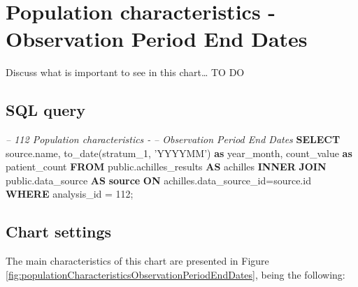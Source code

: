 \documentclass[]{book}
\newenvironment{Shaded}{\begin{snugshade}}{\end{snugshade}}
\newcommand{\KeywordTok}[1]{\textcolor[rgb]{0.13,0.29,0.53}{\textbf{#1}}}
\newcommand{\DecValTok}[1]{\textcolor[rgb]{0.00,0.00,0.81}{#1}}
\newcommand{\StringTok}[1]{\textcolor[rgb]{0.31,0.60,0.02}{#1}}
\newcommand{\CommentTok}[1]{\textcolor[rgb]{0.56,0.35,0.01}{\textit{#1}}}
\newcommand{\FunctionTok}[1]{\textcolor[rgb]{0.00,0.00,0.00}{#1}}
\newcommand{\NormalTok}[1]{#1}
\begin{document}
\section{Population characteristics - Observation Period End
Dates}\label{population-characteristics---observation-period-end-dates}

Discuss what is important to see in this chart\ldots{} TO DO

\subsection{SQL query}\label{sql-query-11}

\begin{Shaded}
\begin{Highlighting}[]
\CommentTok{-- 112  Population characteristics - }
\CommentTok{--      Observation Period End Dates}
\KeywordTok{SELECT}\NormalTok{ source.name,}
       \FunctionTok{to_date}\NormalTok{(stratum_1, }\StringTok{'YYYYMM'}\NormalTok{) }\KeywordTok{as}\NormalTok{ year_month,}
\NormalTok{       count_value }\KeywordTok{as}\NormalTok{ patient_count}
\KeywordTok{FROM}\NormalTok{ public.achilles_results }\KeywordTok{AS}\NormalTok{ achilles }
    \KeywordTok{INNER} \KeywordTok{JOIN}\NormalTok{ public.data_source }\KeywordTok{AS} \KeywordTok{source} \KeywordTok{ON} 
\NormalTok{      achilles.data_source_id=source.id}
\KeywordTok{WHERE}\NormalTok{ analysis_id = }\DecValTok{112}\NormalTok{;}
\end{Highlighting}
\end{Shaded}

\subsection{Chart settings}\label{chart-settings-11}

The main characteristics of this chart are presented in Figure
\ref{fig:populationCharacteristicsObservationPeriodEndDates}, being the
following:
\end{document}
